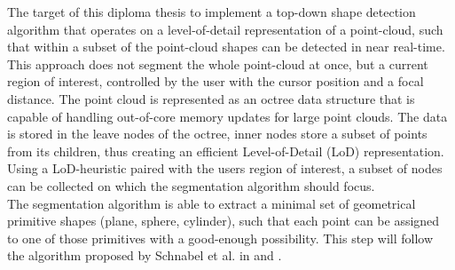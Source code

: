 \documentclass[]{article}
\begin{document}
The target of this diploma thesis to implement a top-down shape detection algorithm that operates on a level-of-detail representation of a point-cloud, such that within a subset of the point-cloud shapes can be detected in near real-time. 
This approach does not segment the whole point-cloud at once, but a current region of interest, controlled by the user with the cursor position and a focal distance. The point cloud is represented as an octree data structure that is capable of handling out-of-core memory updates for large point clouds. The data is stored in the leave nodes of the octree, inner nodes store a subset of points from its children, thus creating an efficient Level-of-Detail (LoD) representation. Using a LoD-heuristic paired with the users region of interest, a subset of nodes can be collected on which the segmentation algorithm should focus. 
\\
The segmentation algorithm is able to extract a minimal set of geometrical primitive shapes (plane, sphere, cylinder), such that each point can be assigned to one of those primitives with a good-enough possibility. This step will follow the algorithm proposed by Schnabel et al. in \cite{schnabel-2007-efficient} and \cite{schnabel-2007-ransac}. 
\\




\end{document}
